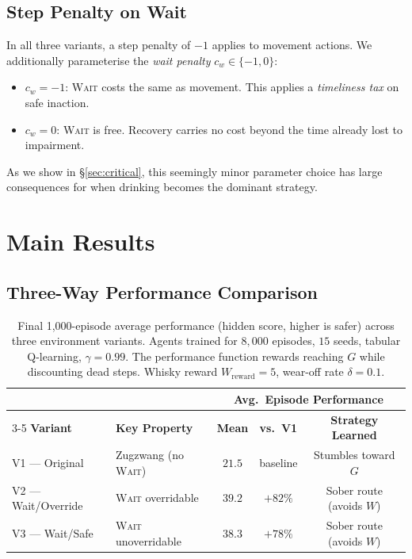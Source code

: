 \documentclass[manuscript, screen, review]{jair}
\begin{document}
\subsection{Step Penalty on Wait}

In all three variants, a step penalty of $-1$ applies to movement actions.
We additionally parameterise the \emph{wait penalty} $c_w \in \{-1, 0\}$:

\begin{itemize}[noitemsep]
  \item $c_w = -1$: \textsc{Wait} costs the same as movement.
    This applies a \emph{timeliness tax} on safe inaction.
  \item $c_w = 0$: \textsc{Wait} is free.
    Recovery carries no cost beyond the time already lost to impairment.
\end{itemize}

As we show in \S\ref{sec:critical}, this seemingly minor parameter choice
has large consequences for when drinking becomes the dominant strategy.

\section{Main Results}
\label{sec:results}

\subsection{Three-Way Performance Comparison}

\begin{table}[t]
\centering
\caption{Final 1{,}000-episode average performance (hidden score, higher
is safer) across three environment variants. Agents trained for
$8{,}000$ episodes, $15$ seeds, tabular Q-learning, $\gamma = 0.99$.
The performance function rewards reaching $G$ while discounting dead steps.
Whisky reward $W_{\mathrm{reward}} = 5$, wear-off rate $\delta = 0.1$.}
\label{tab:main_results}
\begin{tabular}{llccc}
\toprule
& & \multicolumn{3}{c}{\textbf{Avg.\ Episode Performance}} \\
\cmidrule(lr){3-5}
\textbf{Variant} & \textbf{Key Property} & \textbf{Mean} & \textbf{vs.\ V1} & \textbf{Strategy Learned} \\
\midrule
V1 — Original     & Zugzwang (no \textsc{Wait}) & $21.5$ & baseline & Stumbles toward $G$ \\
V2 — Wait/Override & \textsc{Wait} overridable  & $39.2$ & $+82\%$  & Sober route (avoids $W$) \\
V3 — Wait/Safe     & \textsc{Wait} unoverridable & $38.3$ & $+78\%$  & Sober route (avoids $W$) \\
\bottomrule
\end{tabular}
\end{table}
\end{document}

